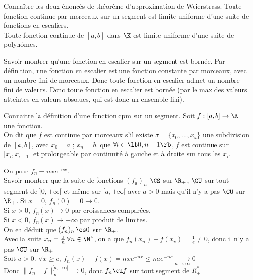 \documentclass[french, 11pt]{article}
\begin{document}
\begin{exercice}{}{}
    Connaître les deux énoncés de théorème d'approximation de Weierstrass.
    \tcblower
     Toute fonction continue par morceaux sur un segment est limite uniforme d'une suite de fonctions en escaliers.\\
     Toute fonction continue de $[a,b]$ dans $\K$ est limite uniforme d'une suite de polynômes.
\end{exercice}

\begin{exercice}{}{}
    Savoir montrer qu'une fonction en escalier sur un segment est bornée.
    \tcblower
    Par définition, une fonction en escalier est une fonction constante par morceaux, avec un nombre fini de morceaux. Donc toute fonction en escalier admet un nombre fini de valeurs. Donc toute fonction en escalier est bornée (par le max des valeurs atteintes en valeurs absolues, qui est donc un ensemble fini).
\end{exercice}

\begin{exercice}{}{}
    Connaitre la définition d'une fonction cpm sur un segment.
    \tcblower
    Soit $f : [a,b] \to \R$ une fonction.\\
    On dit que $f$ est continue par morceaux s'il existe $\sigma = \{x_0, ..., x_n\}$ une subdivision de $[a,b]$, avec $x_0 = a$ ; $x_n = b$, que $\forall i \in \lb 0, n-1 \rb$, $f$ est continue sur $]x_i, x_{i+1}[$ et prolongeable par continuité à gauche et à droite sur tous les $x_i$.
\end{exercice}

\begin{exercice}{}{}
    On pose $f_n = nxe^{-nx}$.\\
    Savoir montrer que la suite de fonctions $(f_n)_n$ $\CS$ sur $\R_+$, $\CU$ sur tout segment de $]0, +\infty[$ et même sur $[a, +\infty[$ avec $a > 0$ mais qu'il n'y a pas $\CU$ sur $\R_+$.
    \tcblower
    \boxed{$\CS$} Si $x = 0$, $f_n(0) = 0 \to 0$.\\
    Si $x > 0$, $f_n(x) \to 0$ par croissances comparées.\\
    Si $x < 0$, $f_n(x) \to -\infty$ par produit de limites.\\
    On en déduit que $(f_n)_n \, \cs 0$ sur $\R_+$.\\
    \boxed{$\CU$} Avec la suite $x_n = \frac 1 n \, \forall n \in \N^*$, on a que $f_n(x_n) - f(x_n) = \frac 1 e \ne 0$, donc il n'y a pas $\CU$ sur $\R_+$\\
    Soit $a > 0$. $\forall x \ge a, \, f_n(x) - f(x) = nxe^{-nx} \le nae^{-na} \underset{n\to\infty}{\to} 0$\\
    Donc $\|f_n - f\|_{\infty}^{[a, +\infty[} \to 0$, donc $f_n \cu f$ sur tout segment de $R^*_+$
\end{exercice}
\end{document}
